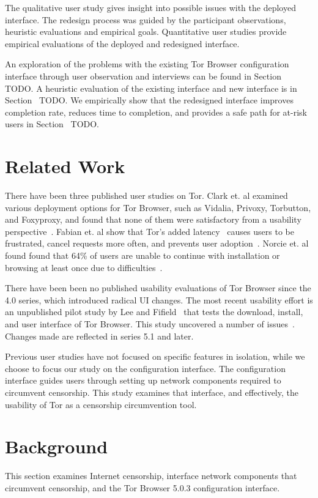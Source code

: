 \documentclass[USenglish,oneside,twocolumn]{article}
\begin{document}
The qualitative user study gives insight into possible issues with
the deployed interface. 
The redesign process was guided by the participant observations, 
heuristic evaluations and empirical goals. 
Quantitative user studies provide empirical evaluations of the deployed
and redesigned interface. 

An exploration of the problems with the existing Tor Browser 
configuration interface through user observation and interviews can be 
found in Section~{\color{red} TODO}. A heuristic evaluation of the existing interface and new interface is in Section~{\color{red} TODO}. We empirically show 
that the redesigned interface improves completion rate, reduces time to completion, 
and provides a safe path for at-risk users in Section~{\color{red} TODO}. 

\section{Related Work} 
There have been three published user studies on Tor. Clark et. al examined various deployment
options for Tor Browser, such as Vidalia, Privoxy, Torbutton, and Foxyproxy, and found that none of them 
were satisfactory from a usability perspective~\cite{clark2007usability}. Fabian et. al show that Tor's added
latency~\cite{dingledine2009performance} causes users
to be frustrated, cancel requests more often, and prevents user adoption~\cite{fabian2010privately}. 
Norcie et. al found found that 
64\% of users are unable to continue with installation or browsing at least once due to difficulties~\cite{norcie2012eliminating}. 

There have been been no published usability evaluations of
Tor Browser since the 4.0 series, which introduced radical UI changes. 
The most recent usability effort is an unpublished pilot study  by Lee and Fifield~\cite {uxsprint} 
that tests the download, install, and  user interface of Tor Browser.  This study uncovered a number of issues~\cite{uxsprint2015-tickets}. Changes made are reflected in series 5.1 and later. 

Previous user studies have not focused on specific features in isolation, while we choose to focus our study on 
the configuration interface. The configuration interface guides users through setting up network components required to circumvent censorship. 
This study examines that interface, and effectively, the usability of Tor as a censorship circumvention tool. 

\section{Background} 
This section examines Internet censorship, interface network components that circumvent censorship, and the Tor Browser 5.0.3 configuration interface. 
\end{document}
